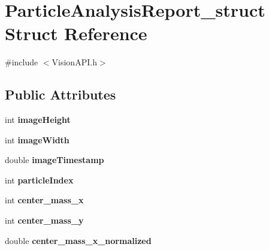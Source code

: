 \hypertarget{structParticleAnalysisReport__struct}{
\section{ParticleAnalysisReport\_\-struct Struct Reference}
\label{structParticleAnalysisReport__struct}
}


{\ttfamily \#include $<$VisionAPI.h$>$}

\subsection*{Public Attributes}
\begin{DoxyCompactItemize}
\item 
\hypertarget{structParticleAnalysisReport__struct_a187ddc71aab2b6f178829c14677cab7d}{
int {\bfseries imageHeight}}
\label{structParticleAnalysisReport__struct_a187ddc71aab2b6f178829c14677cab7d}

\item 
\hypertarget{structParticleAnalysisReport__struct_a4f8c1f05ac76e32d9322245bbe0f7688}{
int {\bfseries imageWidth}}
\label{structParticleAnalysisReport__struct_a4f8c1f05ac76e32d9322245bbe0f7688}

\item 
\hypertarget{structParticleAnalysisReport__struct_a6288815fbca17e943440970a7275aa10}{
double {\bfseries imageTimestamp}}
\label{structParticleAnalysisReport__struct_a6288815fbca17e943440970a7275aa10}

\item 
\hypertarget{structParticleAnalysisReport__struct_a5869a1481f9a3d8b8451febadd566dc9}{
int {\bfseries particleIndex}}
\label{structParticleAnalysisReport__struct_a5869a1481f9a3d8b8451febadd566dc9}

\item 
\hypertarget{structParticleAnalysisReport__struct_a027fea2465191820b210bbef048fd373}{
int {\bfseries center\_\-mass\_\-x}}
\label{structParticleAnalysisReport__struct_a027fea2465191820b210bbef048fd373}

\item 
\hypertarget{structParticleAnalysisReport__struct_a7bfb02ae54d14063d4230c38d48a333f}{
int {\bfseries center\_\-mass\_\-y}}
\label{structParticleAnalysisReport__struct_a7bfb02ae54d14063d4230c38d48a333f}

\item 
\hypertarget{structParticleAnalysisReport__struct_a52b219bb920072d6ccdffb5f17f4ac98}{
double {\bfseries center\_\-mass\_\-x\_\-normalized}}
\label{structParticleAnalysisReport__struct_a52b219bb920072d6ccdffb5f17f4ac98}


\end{DoxyCompactItemize}
